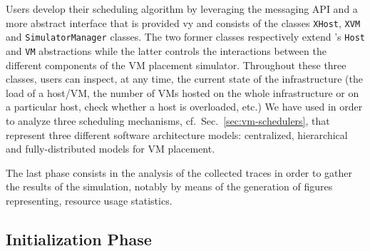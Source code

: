 Users develop their scheduling algorithm by leveraging the \sg
messaging API and a more abstract interface that is provided vy \vmps
and consists of the classes \texttt{XHost}, \texttt{XVM} and
\texttt{SimulatorManager} classes. The two former classes respectively
extend \sg's \texttt{Host} and \texttt{VM} abstractions while the
latter controls the interactions between the different components of
the VM placement simulator.  Throughout these three classes, users can
inspect, at any time, the current state of the infrastructure (\ie the
load of a host/VM, the number of VMs hosted on the whole
infrastructure or on a particular host, check whether a host is
overloaded, etc.) We have used \vmps in order to analyze three
scheduling mechanisms, cf.\ Sec.~\ref{sec:vm-schedulers}, that
represent three different software architecture models: centralized,
hierarchical and fully-distributed models for VM placement.

The last phase consists in the analysis of the collected traces in
order to gather the results of the simulation, notably by means of the
generation of figures representing, \eg resource usage statistics.


\subsection{Initialization Phase}

